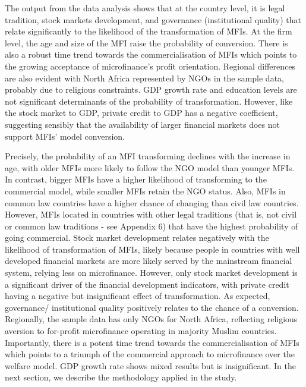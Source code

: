 \documentclass[a4paper,nobind]{templates/ociamthesis}
\begin{document}
The output from the data analysis shows that at the country level, it is legal tradition, stock markets development, and governance (institutional quality) that relate significantly to the likelihood of the transformation of MFIs. At the firm level, the age and size of the MFI raise the probability of conversion. There is also a robust time trend towards the commercialisation of MFIs which points to the growing acceptance of microfinance's profit orientation. Regional differences are also evident with North Africa represented by NGOs in the sample data, probably due to religious constraints. GDP growth rate and education levels are not significant determinants of the probability of transformation. However, like the stock market to GDP, private credit to GDP has a negative coefficient, suggesting sensibly that the availability of larger financial markets does not support MFIs' model conversion.

Precisely, the probability of an MFI transforming declines with the increase in age, with older MFIs more likely to follow the NGO model than younger MFIs. In contrast, bigger MFIs have a higher likelihood of transforming to the commercial model, while smaller MFIs retain the NGO status. Also, MFIs in common law countries have a higher chance of changing than civil law countries. However, MFIs located in countries with other legal traditions (that is, not civil or common law traditions - see Appendix 6) that have the highest probability of going commercial. Stock market development relates negatively with the likelihood of transformation of MFIs, likely because people in countries with well developed financial markets are more likely served by the mainstream financial system, relying less on microfinance. However, only stock market development is a significant driver of the financial development indicators, with private credit having a negative but insignificant effect of transformation. As expected, governance/ institutional quality positively relates to the chance of a conversion. Regionally, the sample data has only NGOs for North Africa, reflecting religious aversion to for-profit microfinance operating in majority Muslim countries. Importantly, there is a potent time trend towards the commercialisation of MFIs which points to a triumph of the commercial approach to microfinance over the welfare model. GDP growth rate shows mixed results but is insignificant. In the next section, we describe the methodology applied in the study.
\end{document}
